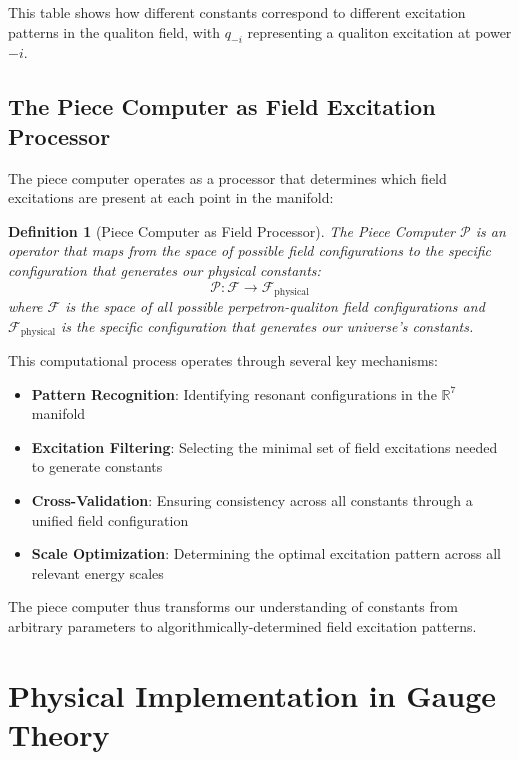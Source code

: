 \documentclass{article}
\newtheorem{definition}{Definition}
\begin{document}
This table shows how different constants correspond to different excitation patterns in the qualiton field, with $q_{-i}$ representing a qualiton excitation at power $-i$.

\subsection{The Piece Computer as Field Excitation Processor}

The piece computer operates as a processor that determines which field excitations are present at each point in the manifold:

\begin{definition}[Piece Computer as Field Processor]
The Piece Computer $\mathcal{P}$ is an operator that maps from the space of possible field configurations to the specific configuration that generates our physical constants:
\begin{equation}
\mathcal{P}: \mathcal{F} \to \mathcal{F}_\text{physical}
\end{equation}
where $\mathcal{F}$ is the space of all possible perpetron-qualiton field configurations and $\mathcal{F}_\text{physical}$ is the specific configuration that generates our universe's constants.
\end{definition}

This computational process operates through several key mechanisms:

\begin{itemize}
\item \textbf{Pattern Recognition}: Identifying resonant configurations in the $\mathbb{R}^7$ manifold
\item \textbf{Excitation Filtering}: Selecting the minimal set of field excitations needed to generate constants
\item \textbf{Cross-Validation}: Ensuring consistency across all constants through a unified field configuration
\item \textbf{Scale Optimization}: Determining the optimal excitation pattern across all relevant energy scales
\end{itemize}

The piece computer thus transforms our understanding of constants from arbitrary parameters to algorithmically-determined field excitation patterns.

\section{Physical Implementation in Gauge Theory}
\end{document}
